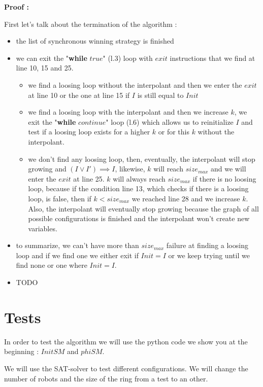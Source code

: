 \documentclass{article}
\begin{document}
\noindent \textbf{Proof :}\newline

First let's talk about the termination of the algorithm :
\begin{itemize}
    \item the list of synchronous winning strategy is finished
    \item we can exit the "\textbf{while} $true$" (l.3) loop with $exit$ instructions that we find at line 10, 15 and 25.
    \begin{itemize}
        \item we find a loosing loop without the interpolant and then we enter the $exit$ at line 10 or the one at line 15 if $I$ is still equal to $Init$
        \item we find a loosing loop with the interpolant and then we increase $k$, we exit the "\textbf{while} $continue$" loop (l.6) which allows us to reinitialize $I$ and test if a loosing loop exists for a higher $k$ or for this $k$ without the interpolant.
        \item we don't find any loosing loop, then, eventually, the interpolant will stop growing and $(I \lor I') \implies I$, likewise, $k$ will reach $size_{max}$ and we will enter the $exit$ at line 25. $k$ will always reach $size_{max}$ if there is no loosing loop, because if the condition line 13, which checks if there is a loosing loop, is false, then if $k < size_{max}$ we reached line 28 and we increase $k$. Also, the interpolant will eventually stop growing because the graph of all possible configurations is finished and the interpolant won't create new variables.
    \end{itemize}
    \item to summarize, we can't have more than $size_{max}$ failure at finding a loosing loop and if we find one we either exit if $Init = I$ or we keep trying until we find none or one where $Init = I$.
    \item TODO
\end{itemize}

\section{Tests}

In order to test the algorithm \cite{algo} we will use the python code we show you at the beginning : $InitSM$ and $phiSM$.

We will use the SAT-solver to test different configurations. We will change the number of robots and the size of the ring from a test to an other.
\end{document}

